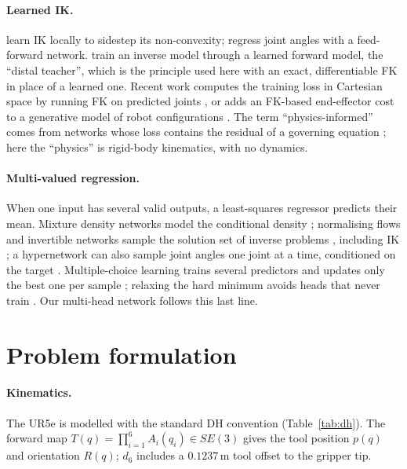 \documentclass[11pt]{article}
\begin{document}
\paragraph{Learned IK.}
\citet{dsouza2001learning} learn IK locally to sidestep its non-convexity;
\citet{duka2014neural} regress joint angles with a feed-forward network.
\citet{jordan1992distal} train an inverse model through a learned forward
model, the ``distal teacher'', which is the principle used here with an exact,
differentiable FK in place of a learned one. Recent work computes the training
loss in Cartesian space by running FK on predicted joints
\citep{habekost2023cycleik}, or adds an FK-based end-effector cost to a
generative model of robot configurations \citep{lembono2021constrained}.
The term ``physics-informed'' comes from networks whose loss contains
the residual of a governing equation \citep{raissi2019pinn,karniadakis2021piml};
here the ``physics'' is rigid-body kinematics, with no dynamics.

\paragraph{Multi-valued regression.}
When one input has several valid outputs, a least-squares regressor predicts
their mean. Mixture density networks model the conditional density
\citep{bishop1994mdn}; normalising flows and invertible networks sample the
solution set of inverse problems \citep{ardizzone2019inn}, including IK
\citep{ames2022ikflow}; a hypernetwork can also sample joint angles one joint
at a time, conditioned on the target \citep{bensadoun2022nik}. Multiple-choice learning trains several predictors and
updates only the best one per sample
\citep{guzmanrivera2012mcl,lee2016smcl}; relaxing the hard minimum avoids heads
that never train \citep{rupprecht2017uncertain}. Our multi-head network follows
this last line.

\section{Problem formulation}
\paragraph{Kinematics.}
The UR5e is modelled with the standard DH convention (Table~\ref{tab:dh}). The
forward map $T(q)=\prod_{i=1}^{6} A_i(q_i)\in SE(3)$ gives the tool position
$p(q)$ and orientation $R(q)$; $d_6$ includes a $0.1237$\,m tool offset to the
gripper tip.
\end{document}
